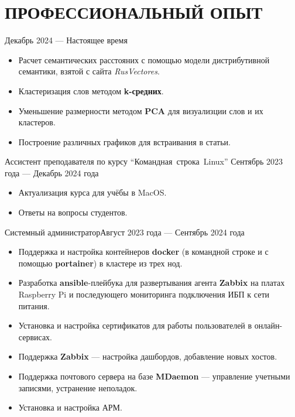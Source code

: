 \section{ПРОФЕССИОНАЛЬНЫЙ ОПЫТ}

    {Декабрь 2024 --- Настоящее время}
    
\begin{itemize}
  \setlength\itemsep{-.5em}
\item Расчет семантических расстояних с помощью модели дистрибутивной
  семантики, взятой с сайта \textit{RusVectores}.
\item Кластеризация слов методом \textbf{k-средних}.
\item Уменьшение размерности методом \textbf{PCA} для визуализции слов
  и их кластеров.
\item Построение различных графиков для встраивания в статьи.
\end{itemize}
      

 {Ассистент преподавателя по курсу
  “\mbox{Командная}~строка~Linux”} {Сентябрь 2023 года --- Декабрь
  2024 года}
\begin{itemize}
  \setlength\itemsep{-.5em}
\item Актуализация курса для учёбы в MacOS.
\item Ответы на вопросы студентов.
\end{itemize}

\vspace{-0.5em}

 {Системный администратор}{Август 2023 года ---
  Сентябрь 2024 года}
\begin{itemize}
  \setlength\itemsep{-.5em}
\item Поддержка и настройка контейнеров \textbf{docker} (в командной
  строке и с помощью \textbf{portainer}) в кластере из трех нод.
\item Разработка \textbf{ansible}-плейбука для развертывания агента
  \textbf{Zabbix} на платах Raspberry Pi и последующего мониторинга
  подключения ИБП к сети питания.
\item Установка и настройка сертификатов для работы пользователей в
  онлайн-сервисах.
\item Поддержка \textbf{Zabbix} — настройка дашбордов, добавление
  новых хостов.
\item Поддержка почтового сервера на базе \textbf{MDaemon} —
  управление учетными записями, устранение неполадок.
\item Установка и настройка АРМ.
\end{itemize}

